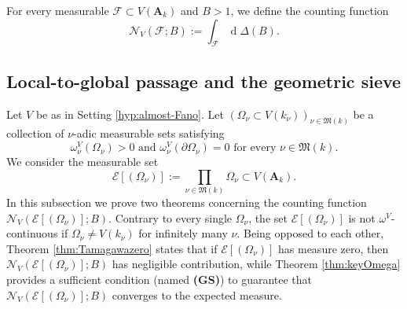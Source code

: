 \documentclass[11pt,letterpaper]{amsart}
\newcommand{\CE}{{\mathcal {E}}}
\newcommand{\CF}{{\mathcal {F}}}
\newcommand{\CN}{{\mathcal {N}}}
\newcommand{\RA}{{\mathbf {A}}}
\theoremstyle{plain}
\numberwithin{equation}{section}
\theoremstyle{definition}
\theoremstyle{remark}
\begin{document}
For every measurable $\CF\subset V(\RA_k)$ and $B>1$, we define the counting function
\begin{equation}\label{eq:countingDelta}
	\CN_{V}(\CF;B):=\int_{\CF}\operatorname{d}\Delta(B).
\end{equation}

\subsection{Local-to-global passage and the geometric sieve}\label{se:local-to-global}
Let $V$ be as in Setting \ref{hyp:almost-Fano}.
Let $(\Omega_\nu\subset V(k_\nu))_{\nu\in\mathfrak{M}(k)}$ be a collection of $\nu$-adic measurable sets satisfying \begin{equation}\label{eq:posmeas}
	\omega_\nu^V(\Omega_\nu)>0\text{ and } \omega^V_\nu(\partial\Omega_\nu)=0 \text{ for every } \nu\in\mathfrak{M}(k).
\end{equation}
We consider the measurable set $$\CE[(\Omega_{\nu})]:=\prod_{\nu\in\mathfrak{M}(k)}\Omega_\nu\subset V(\RA_k).$$
In this subsection we prove two theorems concerning the counting function $\CN_V\left(\CE[(\Omega_{\nu})];B\right)$.
Contrary to every single $\Omega_{\nu}$, the set $\CE[(\Omega_{\nu})]$ is not $\omega^V$-continuous if $\Omega_{\nu}\neq V(k_{\nu})$ for infinitely many $\nu$. Being opposed to each other, Theorem \ref{thm:Tamagawazero} states that if $\CE[(\Omega_{\nu})]$ has measure zero, then $\CN_V\left(\CE[(\Omega_{\nu})];B\right)$ has negligible contribution, while Theorem \ref{thm:keyOmega} provides a sufficient condition (named \textbf{(GS)}) to guarantee that $\CN_V\left(\CE[(\Omega_{\nu})];B\right)$ converges to the expected measure.
\end{document}
